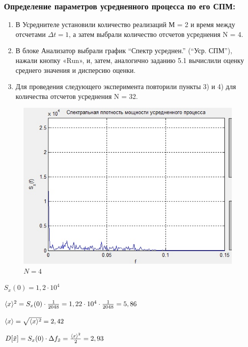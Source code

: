 \subsubsection[Задание 5.1]{Определение параметров усредненного процесса по его СПМ:}
\begin{enumerate}
	\item В Усреднителе установили количество реализаций М = 2 и время между отсчетами $\Delta t = 1$, а затем выбрали количество отсчетов усреднения N = 4.
	\item В блоке Анализатор выбрали график “Спектр усреднен.” (“Уср. СПМ”), нажали кнопку «Run», и, затем, аналогично заданию 5.1 вычислили оценку среднего значения и дисперсию оценки.
	\item Для проведения следующего эксперимента повторили пункты 3) и 4) для количества отсчетов усреднения N = 32.
\end{enumerate}
\begin{figure}[H]
	\centering
	\includegraphics[width=0.8\linewidth]{tasks/task5/realize2}
	\caption*{$N = 4$}
\end{figure}

$S_x(0)=1,2\cdot 10^4$

$\langle x\rangle^2 = S_x(0)\cdot \frac{1}{2048}= 1,22\cdot 10^4\cdot \frac{1}{2048} = 5,86$

$\langle x\rangle =  \sqrt{\langle x\rangle^2} = 2,42$

$D[\tilde{x}] = S_x(0)\cdot \Delta f_{\tilde{x}} =\frac{\langle x\rangle^2}{2} = 2,93$


